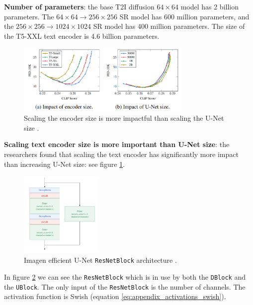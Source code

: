 \textbf{Number of parameters}: the base T2I diffusion $64\times 64$ model has 2 billion parameters. The $64\times 64 \rightarrow 256\times 256$ SR model has 600 million parameters, and the $256\times 256 \rightarrow 1024\times 1024$ SR model has 400 million parameters. The size of the T5-XXL text encoder is 4.6 billion parameters.

\begin{figure}
    \centering
    \includegraphics[width=0.75\textwidth]{images/imagen/encoder_vs_unet_size_impact.png}
    \caption{Scaling the encoder size is more impactful than scaling the U-Net size \cite{imagen}.}
    \label{fig:imagen_scaling_encoder_more_impactful_than_unet_scaling}
\end{figure}

\textbf{Scaling text encoder size is more important than U-Net size}: the researchers found that scaling the text encoder has significantly more impact than increasing U-Net size: see figure \ref{fig:imagen_scaling_encoder_more_impactful_than_unet_scaling}.




\begin{figure}
    \centering
    \includegraphics[width=0.35\textwidth]{images/appendix/imagen/unet_resnetblock.png}
    \caption{Imagen efficient U-Net \texttt{ResNetBlock} architecture \cite{imagen}.}
    \label{fig:imagen_resnetblock}
\end{figure}

In figure \ref{fig:imagen_resnetblock} we can see the \texttt{ResNetBlock} which is in use by both the \texttt{DBlock} and the \texttt{UBlock}. The only input of the \texttt{ResNetBlock} is the number of channels. The activation function is Swish (equation \ref{eq:appendix_activations_swish}).

